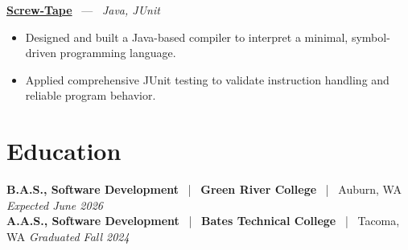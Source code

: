 \documentclass[10pt, letterpaper]{article}
\newcommand{\jobhead}[4]{%
  \vspace{5pt}%
  {\bfseries\color{dark}#1}%
  ~{\color{light}|}~%
  {\bfseries\color{navy}#2}%
  ~{\color{light}|}~%
  {\color{light}#3}%
  \hfill{\color{light}\small\textit{#4}}\\[-2pt]%
}
\newcommand{\projhead}[3]{%
  \vspace{5pt}%
  {\bfseries\color{dark}\href{#2}{#1}}%
  ~{\color{light}---}~%
  {\color{light}\small\textit{#3}}\\[-2pt]%
}
\begin{document}
\projhead{Screw-Tape}{https://github.com/timmyd4/screwtape}{Java, JUnit}
\begin{itemize}
  \item Designed and built a Java-based compiler to interpret a minimal, symbol-driven programming language.
  \item Applied comprehensive JUnit testing to validate instruction handling and reliable program behavior.
\end{itemize}

\section{Education}

\jobhead{B.A.S., Software Development}{Green River College}{Auburn, WA}{Expected June 2026}
\jobhead{A.A.S., Software Development}{Bates Technical College}{Tacoma, WA}{Graduated Fall 2024}
\end{document}
